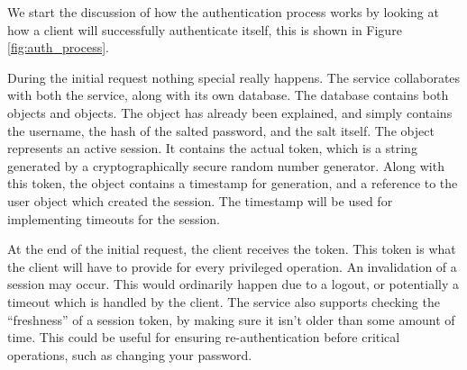 We start the discussion of how the authentication process works by looking at
how a client will successfully authenticate itself, this is shown in Figure
\ref{fig:auth_process}.

During the initial request nothing special really happens. The \security
service collaborates with both the \bcrypt service, along with its own
database. The database contains both  objects and 
objects. The  object has already been explained, and simply contains
the username, the hash of the salted password, and the salt itself. The
 object represents an active session. It contains the actual
token, which is a string generated by a cryptographically secure random number
generator. Along with this token, the object contains a timestamp for
generation, and a reference to the user object which created the session. The
timestamp will be used for implementing timeouts for the session.

At the end of the initial request, the client receives the token. This token is
what the client will have to provide for every privileged operation.  An
invalidation of a session may occur. This would ordinarily happen due to a
logout, or potentially a timeout which is handled by the client. The \security
service also supports checking the ``freshness'' of a session token, by making
sure it isn't older than some amount of time. This could be useful for ensuring
re-authentication before critical operations, such as changing your password.

